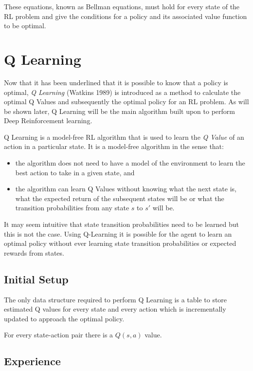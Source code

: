 \documentclass{article}
\begin{document}
These equations, known as Bellman equations, must hold for every state of the RL problem and give the conditions for a policy and its associated value function to be optimal. 

\newpage

\section{Q Learning}

Now that it has been underlined that it is possible to know that a policy is optimal, \textit{Q Learning} (Watkins 1989) is introduced as a method to calculate the optimal Q Values and subsequently the optimal policy for an RL problem\cite{Watkins:89}. As will be shown later, Q Learning will be the main algorithm built upon to perform Deep Reinforcement learning. 

Q Learning is a model-free RL algorithm that is used to learn the \textit{Q Value} of an action in a particular state. It is a model-free algorithm in the sense that:

\begin{itemize}
    \item the algorithm does not need to have a model of the environment to learn the best action to take in a given state, and 
    
    \item the algorithm can learn Q Values without knowing what the next state is, what the expected return of the subsequent states will be or what the transition probabilities from any state $s$ to $s'$ will be. 
\end{itemize}

It may seem intuitive that state transition probabilities need to be learned but this is not the case. Using Q-Learning it is possible for the agent to learn an optimal policy without ever learning state transition probabilities or expected rewards from states\cite{RLNotes}.

\subsection{Initial Setup}

The only data structure required to perform Q Learning is a table to store estimated Q values for every state and every action which is incrementally updated to approach the optimal policy.

For every state-action pair there is a $Q(s,a)$ value.

\subsection{Experience}
\end{document}

